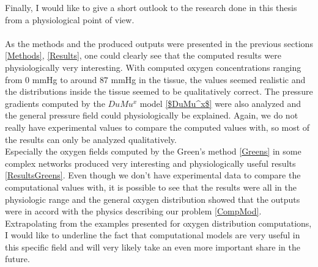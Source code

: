 Finally, I would like to give a short outlook to the research done in this thesis from a physiological point of view.\\
\\As the methods and the produced outputs were presented in the previous sections \ref{Methods}, \ref{Results}, one could clearly see that the computed results were physiologically very interesting. With computed oxygen concentrations ranging from $0$ mmHg to around $87$ mmHg in the tissue, the values seemed realistic and the distributions inside the tissue seemed to be qualitatively correct. The pressure gradients computed by the $DuMu^x$ model \ref{$DuMu^x$} were also analyzed and the general pressure field could physiologically be explained. Again, we do not really have experimental values to compare the computed values with, so most of the results can only be analyzed qualitatively.
\\Especially the oxygen fields computed by the Green's method \ref{Greens} in some complex networks produced very interesting and physiologically useful results \ref{ResultsGreens}. Even though we don't have experimental data to compare the computational values with, it is possible to see that the results were all in the physiologic range and the general oxygen distribution showed that the outputs were in accord with the physics describing our problem \ref{CompMod}. Extrapolating from the examples presented for oxygen distribution computations, I would like to underline the fact that computational models are very useful in this specific field and will very likely take an even more important share in the future.
\\
